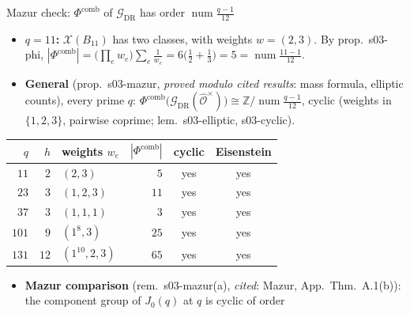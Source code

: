 \begin{frame}{Mazur check: $\Phi^{\mathrm{comb}}$ of $\mathcal G_{\mathrm{DR}}$ has order $\operatorname{num}\frac{q-1}{12}$}
  \footnotesize
  \begin{itemize}
    \item \textbf{$q=11$:} $\mathcal X(B_{11})$ has two classes, with weights $w=(2,3)$. By prop.\ s03-phi,
      $|\Phi^{\mathrm{comb}}|=\big(\prod_e w_e\big)\sum_e\tfrac1{w_e}=6\big(\tfrac12+\tfrac13\big)=5=\operatorname{num}\tfrac{11-1}{12}$.
    \item \textbf{General} (prop.\ s03-mazur, \emph{proved modulo cited results}: mass formula, elliptic counts), every prime $q$:
      $\Phi^{\mathrm{comb}}\big(\mathcal G_{\mathrm{DR}}(\widehat{\mathcal O}^\times)\big)\cong \mathbb Z/\operatorname{num}\tfrac{q-1}{12}$, cyclic
      (weights in $\{1,2,3\}$, pairwise coprime; lem.\ s03-elliptic, s03-cyclic).
  \end{itemize}
  \vspace{-1mm}
  \begin{center}\scriptsize
  \begin{tabular}{rrlrcc}\toprule
    $q$ & $h$ & weights $w_e$ & $|\Phi^{\mathrm{comb}}|$ & cyclic & Eisenstein\\\midrule
    $11$  & $2$  & $(2,3)$ & $5$  & yes & yes\\
    $23$  & $3$  & $(1,2,3)$ & $11$ & yes & yes\\
    $37$  & $3$  & $(1,1,1)$ & $3$  & yes & yes\\
    $101$ & $9$  & $(1^8,3)$ & $25$ & yes & yes\\
    $131$ & $12$ & $(1^{10},2,3)$ & $65$ & yes & yes\\\bottomrule
  \end{tabular}
  \end{center}
  \vspace{-1mm}
  \begin{itemize}
    \item \textbf{Mazur comparison} (rem.\ s03-mazur(a), \emph{cited}: Mazur, App.\ Thm.\ A.1(b)): the component group of $J_0(q)$ at $q$ is cyclic of order

\end{itemize}
\end{frame}
